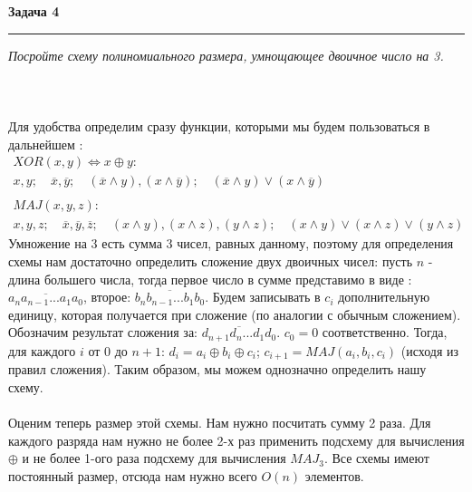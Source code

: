 \documentclass[11pt,a4paper]{scrartcl}
\begin{document}
\textbf{\Large Задача 4}
\medskip\hrule\medskip 
\textit{Посройте схему полиномиального размера, умнощающее двоичное число на 3.} \\ \\
 \\ \\ 
Для удобства определим сразу функции, которыми мы будем пользоваться в дальнейшем : \\
\begin{gather*}
	XOR(x, y) \Leftrightarrow x \oplus y:\\  x, y; \quad \overline{x}, \overline{y}; \quad (\overline{x} \land y), (x \land \overline{y}); \quad (\overline{x} \land y) \lor (x \land \overline{y}) \\ \\
	MAJ(x, y, z): \\
	x, y, z;\quad \overline{x}, \overline{y}, \overline{z}; \quad (x \land y), (x \land z), (y \land z); \quad (x \land y) \lor (x \land z) \lor (y \land z)	
\end{gather*}
Умножение на 3 есть сумма 3 чисел, равных данному, поэтому для определения схемы нам достаточно определить сложение двух двоичных чисел: пусть $ n $ - длина большего числа, тогда первое число в сумме представимо в виде : $\overline{ a_n a_{n - 1}...a_1 a_0 }$, второе: $\overline{ b_n b_{n - 1}...b_1 b_0 }$. Будем записывать в $ c_i $ дополнительную единицу, которая получается при сложение (по аналогии с обычным сложением). Обозначим результат сложения за: $\overline{ d_{n + 1} d_{n}...d_1 d_0 }$. $ c_0 = 0 $ соответственно. Тогда, для каждого $ i $ от $ 0 \text{ до } n + 1$: $ d_i = a_i \oplus b_i \oplus c_i$; $ c_{i + 1} = MAJ(a_i, b_i, c_i) $ (исходя из правил сложения). Таким образом, мы можем однозначно определить нашу схему. \\ \\
Оценим теперь размер этой схемы. Нам нужно посчитать сумму 2 раза. Для каждого разряда нам нужно не более 2-х раз применить подсхему для вычисления $ \oplus $ и не более 1-ого раза подсхему для вычисления $ MAJ_3 $. Все схемы имеют постоянный размер, отсюда нам нужно всего $ O(n) $ элементов.
\\ \\ \\
\end{document}

